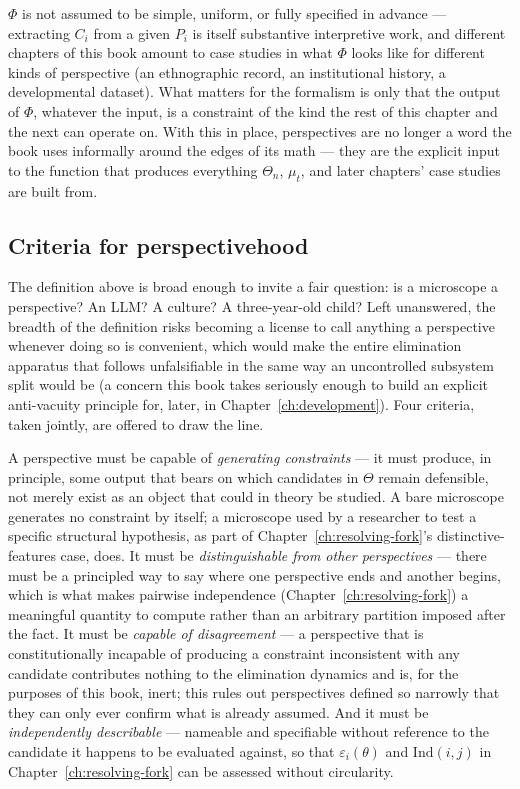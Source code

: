 $\Phi$ is not assumed to be simple, uniform, or fully specified in advance --- extracting $C_i$ from a given $P_i$ is itself substantive interpretive work, and different chapters of this book amount to case studies in what $\Phi$ looks like for different kinds of perspective (an ethnographic record, an institutional history, a developmental dataset). What matters for the formalism is only that the output of $\Phi$, whatever the input, is a constraint of the kind the rest of this chapter and the next can operate on. With this in place, perspectives are no longer a word the book uses informally around the edges of its math --- they are the explicit input to the function that produces everything $\Theta_n$, $\mu_t$, and later chapters' case studies are built from.

\subsection*{Criteria for perspectivehood}

The definition above is broad enough to invite a fair question: is a microscope a perspective? An LLM? A culture? A three-year-old child? Left unanswered, the breadth of the definition risks becoming a license to call anything a perspective whenever doing so is convenient, which would make the entire elimination apparatus that follows unfalsifiable in the same way an uncontrolled subsystem split would be (a concern this book takes seriously enough to build an explicit anti-vacuity principle for, later, in Chapter~\ref{ch:development}). Four criteria, taken jointly, are offered to draw the line.

A perspective must be capable of \emph{generating constraints} --- it must produce, in principle, some output that bears on which candidates in $\Theta$ remain defensible, not merely exist as an object that could in theory be studied. A bare microscope generates no constraint by itself; a microscope used by a researcher to test a specific structural hypothesis, as part of Chapter~\ref{ch:resolving-fork}'s distinctive-features case, does. It must be \emph{distinguishable from other perspectives} --- there must be a principled way to say where one perspective ends and another begins, which is what makes pairwise independence (Chapter~\ref{ch:resolving-fork}) a meaningful quantity to compute rather than an arbitrary partition imposed after the fact. It must be \emph{capable of disagreement} --- a perspective that is constitutionally incapable of producing a constraint inconsistent with any candidate contributes nothing to the elimination dynamics and is, for the purposes of this book, inert; this rules out perspectives defined so narrowly that they can only ever confirm what is already assumed. And it must be \emph{independently describable} --- nameable and specifiable without reference to the candidate it happens to be evaluated against, so that $\varepsilon_i(\theta)$ and $\mathrm{Ind}(i,j)$ in Chapter~\ref{ch:resolving-fork} can be assessed without circularity.

